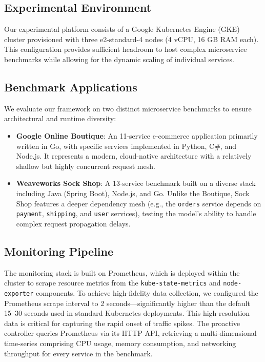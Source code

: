 \documentclass[conference]{IEEEtran}
\begin{document}
\subsection{Experimental Environment}
Our experimental platform consists of a Google Kubernetes Engine (GKE) cluster provisioned with three e2-standard-4 nodes (4 vCPU, 16 GB RAM each). This configuration provides sufficient headroom to host complex microservice benchmarks while allowing for the dynamic scaling of individual services.

\subsection{Benchmark Applications}
We evaluate our framework on two distinct microservice benchmarks to ensure architectural and runtime diversity:

\begin{itemize}
    \item \textbf{Google Online Boutique}: An 11-service e-commerce application primarily written in Go, with specific services implemented in Python, C\#, and Node.js. It represents a modern, cloud-native architecture with a relatively shallow but highly concurrent request mesh.
    \item \textbf{Weaveworks Sock Shop}: A 13-service benchmark built on a diverse stack including Java (Spring Boot), Node.js, and Go. Unlike the Boutique, Sock Shop features a deeper dependency mesh (e.g., the \texttt{orders} service depends on \texttt{payment}, \texttt{shipping}, and \texttt{user} services), testing the model's ability to handle complex request propagation delays.
\end{itemize}

\subsection{Monitoring Pipeline}
The monitoring stack is built on Prometheus, which is deployed within the cluster to scrape resource metrics from the \texttt{kube-state-metrics} and \texttt{node-exporter} components. To achieve high-fidelity data collection, we configured the Prometheus scrape interval to 2 seconds—significantly higher than the default 15--30 seconds used in standard Kubernetes deployments. This high-resolution data is critical for capturing the rapid onset of traffic spikes. The proactive controller queries Prometheus via its HTTP API, retrieving a multi-dimensional time-series comprising CPU usage, memory consumption, and networking throughput for every service in the benchmark.
\end{document}
